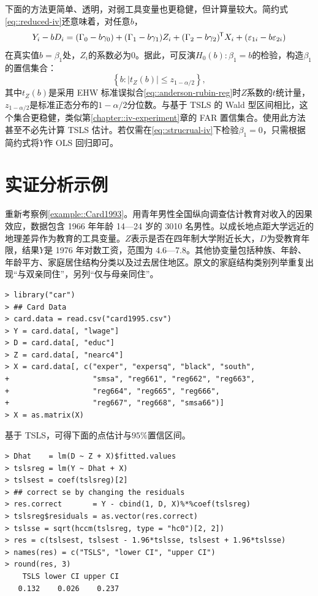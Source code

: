 下面的方法更简单、透明，对弱工具变量也更稳健，但计算量较大。简约式\eqref{eq::reduced-iv}还意味着，对任意$b$，
\begin{eqnarray}
\label{eq::anderson-rubin-reg}
Y_i  - bD_i = (\Gamma_0 -b \gamma_0 ) +  (\Gamma_1  - b \gamma_1 ) Z_i
+ (\Gamma_2 - b \gamma_2  ) ^{\mkern-1.5mu\mathsf{T}} X_i  + ( \varepsilon_{1i} -  b \varepsilon_{2i} )
\end{eqnarray}
在真实值$b = \beta_1$处，$Z_i$的系数必为$0$。据此，可反演$H_0(b): \beta_1 = b$的检验，构造$\beta_1$的置信集合：
$$
\left\{ b:  | t_Z(b) | \leq z_{1-\alpha/2} \right\},
$$
其中$t_Z(b) $是采用 EHW 标准误拟合\eqref{eq::anderson-rubin-reg}时$Z$系数的$t$统计量，$z_{1-\alpha/2}$是标准正态分布的$1-\alpha/2$分位数。与基于 TSLS 的 Wald 型区间相比，这个集合更稳健，类似第\ref{chapter::iv-experiment}章的 FAR 置信集合。使用此方法甚至不必先计算 TSLS 估计。若仅需在\eqref{eq::strucrual-iv}下检验$\beta_1 = 0$，只需根据简约式将$Y$作 OLS 回归即可。 



\section{实证分析示例}\label{sec::tsls-application}

 

重新考察例\ref{example::Card1993}。\citet{card1993using}用青年男性全国纵向调查估计教育对收入的因果效应，数据包含 1966 年年龄 14—24 岁的 3010 名男性。\citet{card1993using}以成长地点距大学远近的地理差异作为教育的工具变量。$Z$表示是否在四年制大学附近长大，$D$为受教育年限，结果$Y$是 1976 年对数工资，范围为 4.6—7.8。其他协变量包括种族、年龄、年龄平方、家庭居住结构分类以及过去居住地区。原文的家庭结构类别列举重复出现“与双亲同住”，另列“仅与母亲同住”。 



\begin{lstlisting}
> library("car")
> ## Card Data
> card.data = read.csv("card1995.csv")
> Y = card.data[, "lwage"]
> D = card.data[, "educ"]
> Z = card.data[, "nearc4"]
> X = card.data[, c("exper", "expersq", "black", "south", 
+                   "smsa", "reg661", "reg662", "reg663", 
+                   "reg664", "reg665", "reg666", 
+                   "reg667", "reg668", "smsa66")]
> X = as.matrix(X)
\end{lstlisting}


基于 TSLS，可得下面的点估计与$95\%$置信区间。 
\begin{lstlisting}
> Dhat    = lm(D ~ Z + X)$fitted.values
> tslsreg = lm(Y ~ Dhat + X)
> tslsest = coef(tslsreg)[2]
> ## correct se by changing the residuals
> res.correct       = Y - cbind(1, D, X)%*%coef(tslsreg)
> tslsreg$residuals = as.vector(res.correct)
> tslsse = sqrt(hccm(tslsreg, type = "hc0")[2, 2])
> res = c(tslsest, tslsest - 1.96*tslsse, tslsest + 1.96*tslsse)
> names(res) = c("TSLS", "lower CI", "upper CI")
> round(res, 3)
    TSLS lower CI upper CI 
   0.132    0.026    0.237 
\end{lstlisting}


